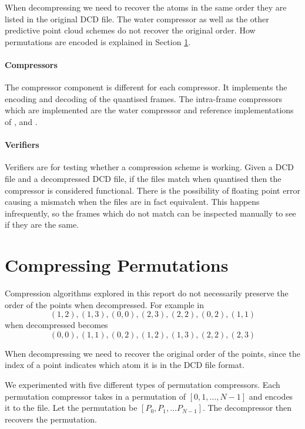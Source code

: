 \documentclass[a4paper]{report}
\begin{document}
When decompressing we need to recover the atoms in the same order they are
listed in the original DCD file. The water compressor as well as the other
predictive point cloud schemes do not recover the original order. How
permutations are encoded is explained in Section \ref{sec:compr-perm}.


\paragraph{Compressors}

The compressor component is different for each compressor. It implements the
encoding and decoding of the quantised frames. The intra-frame compressors
which are implemented are the water compressor and reference implementations
of \citet{omeltchenko2000sls}, \citet{gumholdcomp} and
\citet{devillers2000gci}.


\paragraph{Verifiers}

Verifiers are for testing whether a compression scheme is working. Given a DCD
file and a decompressed DCD file, if the files match when quantised then the
compressor is considered functional. There is the possibility of floating
point error causing a mismatch when the files are in fact equivalent. This
happens infrequently, so the frames which do not match can be inspected
manually to see if they are the same.


\section{Compressing Permutations}
\label{sec:compr-perm}

Compression algorithms explored in this report do not necessarily preserve the
order of the points when decompressed. For example in \citet{devillers2000gci}
\[ (1, 2), (1, 3), (0, 0), (2, 3), (2, 2), (0, 2), (1, 1) \]
when decompressed becomes
\[ (0, 0), (1, 1), (0, 2), (1, 2), (1, 3), (2, 2), (2, 3) \]

When decompressing we need to recover the original order of the points, since
the index of a point indicates which atom it is in the DCD file format.

We experimented with five different types of permutation compressors. Each
permutation compressor takes in a permutation of $[0,1,\dots,N-1]$ and encodes
it to the file. Let the permutation be $[P_0, P_1, \dots P_{N-1}]$. The
decompressor then recovers the permutation.
\end{document}

